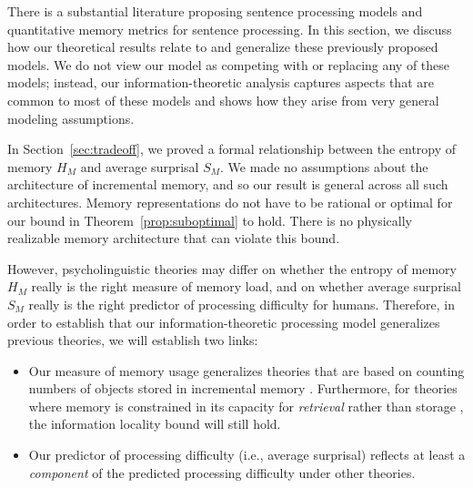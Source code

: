 There is a substantial literature proposing sentence processing models and quantitative memory metrics for sentence processing.
In this section, we discuss how our theoretical results relate to and generalize these previously proposed models.
We do not view our model as competing with or replacing any of these models; instead, our information-theoretic analysis captures aspects that are common to most of these models and shows how they arise from very general modeling assumptions. 

In Section~\ref{sec:tradeoff}, we proved a formal relationship between the entropy of memory $H_M$ and average surprisal $S_M$. 
We made no assumptions about the architecture of incremental memory, and so our result is general across all such architectures.
Memory representations do not have to be rational or optimal for our bound in Theorem~\ref{prop:suboptimal} to hold.
There is no physically realizable memory architecture that can violate this bound.

However, psycholinguistic theories may differ on whether the entropy of memory $H_M$ really is the right measure of memory load, and on whether average surprisal $S_M$ really is the right predictor of processing difficulty for humans. Therefore, in order to establish that our information-theoretic processing model generalizes previous theories, we will establish two links:
\begin{itemize}
    \item Our measure of memory usage generalizes theories that are based on counting numbers of objects stored in incremental memory \citep[e.g.,][]{yngve1960model,miller-finitary-1963,frazier1985syntactic,gibson-linguistic-1998,kobele2013memory,graf2014evaluating,GrafEtAl15MOL,gerth2015memory,GrafEtAl17JLM,desanto2020parsing}. Furthermore, for theories where memory is constrained in its capacity for \emph{retrieval} rather than storage \citep[e.g.,][]{mcelree-memory-2003,lewis-activation-based-2005}, the information locality bound will still hold.
    \item Our predictor of processing difficulty (i.e., average surprisal) reflects at least a \emph{component} of the predicted processing difficulty under other theories.
\end{itemize}

